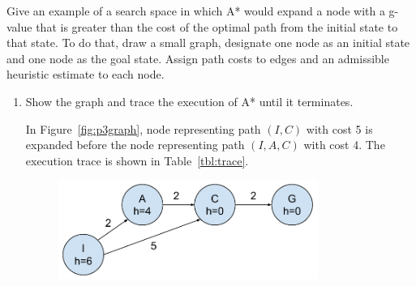 \documentclass[12pt]{article}
\newenvironment{problem}[2][Problem]{\begin{trivlist}
\item[\hskip \labelsep {\bfseries #1}\hskip \labelsep {\bfseries #2.}]}{\end{trivlist}}
\begin{document}
\begin{problem}{3}
	Give an example of a search space in which A* would expand a node with a g-value that is greater than the cost of the optimal path from the initial state to that state.
	To do that, draw a small graph, designate one node as an initial state and one node as the goal state.
	Assign path costs to edges and an admissible heuristic estimate to each node.
	\begin{enumerate}
		\item Show the graph and trace the execution of A* until it terminates.

			\vspace{0.25cm}
			In Figure~\ref{fig:p3graph}, node representing path $(I,C)$ with cost 5 is expanded before the node representing path $(I,A,C)$ with cost 4. The execution trace is shown in Table~\ref{tbl:trace}.
			\begin{figure}[h]
				\centering
				\includegraphics[width=0.8\textwidth]{fig/p3graph.pdf}

\end{figure}
\end{enumerate}
\end{problem}
\end{document}
